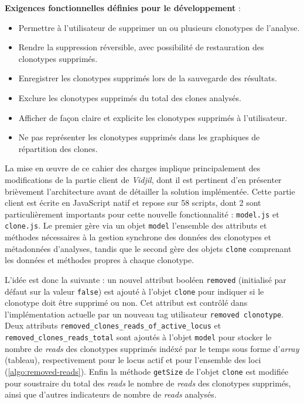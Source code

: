 \vspace{1em}

\textbf{Exigences fonctionnelles définies pour le développement} :
\begin{itemize}
    \item Permettre à l'utilisateur de supprimer un ou plusieurs clonotypes de l'analyse.
    \item Rendre la suppression réversible, avec possibilité de restauration des clonotypes supprimés.
    \item Enregistrer les clonotypes supprimés lors de la sauvegarde des résultats.
    \item Exclure les clonotypes supprimés du total des clones analysés.
    \item Afficher de façon claire et explicite les clonotypes supprimés à l'utilisateur.
    \item Ne pas représenter les clonotypes supprimés dans les graphiques de répartition des clones.
\end{itemize}

\vspace{1em}

La mise en œuvre de ce cahier des charges implique principalement des modifications de la partie client de \textit{Vidjil}, dont il est 
pertinent d'en présenter brièvement l'architecture avant de détailler la solution implémentée. Cette partie client est écrite en JavaScript natif 
et repose sur 58 scripts, dont 2 sont particulièrement importants pour cette nouvelle fonctionnalité : \texttt{model.js} et \texttt{clone.js}. 
Le premier gère via un objet \texttt{model} l'ensemble des attributs et méthodes nécessaires à la gestion synchrone des données des clonotypes 
et métadonnées d'analyses, tandis que le second gère des objets \texttt{clone} comprenant les données et méthodes propres à chaque clonotype. 

\vspace{1em}

L'idée est donc la suivante : un nouvel attribut booléen \texttt{removed} (initialisé par défaut sur la valeur \texttt{false}) est ajouté à l'objet 
\texttt{clone} pour indiquer si le clonotype doit être supprimé ou non. Cet attribut est contrôlé dans l'implémentation actuelle par un nouveau 
tag utilisateur \texttt{removed\ clonotype}. Deux attributs \texttt{removed\_clones\_reads\_of\_active\_locus} et \texttt{removed\_clones\_reads\_total} sont 
ajoutés à l'objet \texttt{model} pour stocker le nombre de \textit{reads} des clonotypes supprimés indéxé par le temps sous forme d'\textit{array} (tableau), 
respectivement pour le locus actif et pour l'ensemble des loci (\autoref{algo:removed-reads}). 
Enfin la méthode \texttt{getSize} de l'objet \texttt{clone} est modifiée pour soustraire du total des \textit{reads} le nombre de \textit{reads} des clonotypes 
supprimés, ainsi que d'autres indicateurs de nombre de \textit{reads} analysés.

